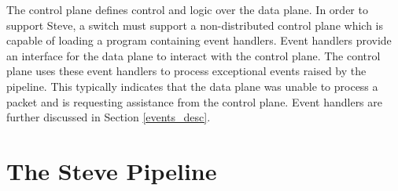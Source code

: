 The control plane defines control
and logic over the data plane.
In order to support Steve, a switch must support a non-distributed control
plane which is capable of loading a program containing event handlers.
Event handlers provide an interface for the data plane to interact with
the control plane.
The control plane uses these event handlers
to process exceptional events raised by the pipeline.
This typically indicates that the data plane was unable to process a packet
and is requesting assistance from the control plane.
Event handlers are further discussed in Section \ref{events_desc}.

%
%
%
%

\section{The Steve Pipeline} \label{pipeline_desc}


